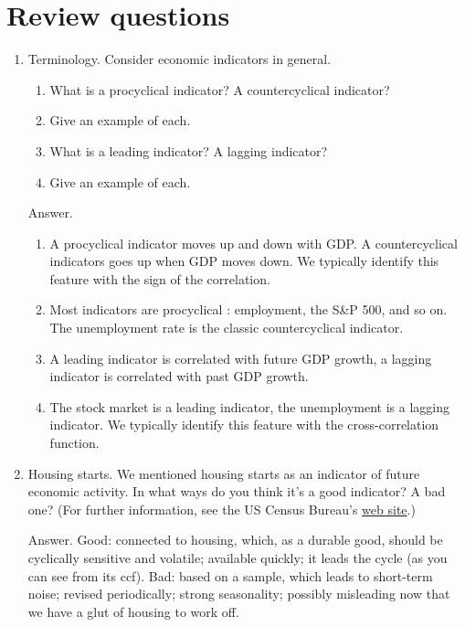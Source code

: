 \section*{Review questions}

\begin{enumerate}
\item Terminology. Consider economic indicators in general.
\begin{enumerate}
\item What is a procyclical indicator? A   countercyclical
 indicator?
\item Give an example of each.
\item What is a leading indicator?  A lagging indicator?
\item Give an example of each.
\end{enumerate}

Answer.
\begin{enumerate}
\item A procyclical indicator moves up and down with GDP.
A   countercyclical
 indicators goes up when GDP moves down.
We typically identify this feature with the sign of the correlation.
\item Most indicators are procyclical
:  employment, the S\&P 500, and so on.
The unemployment rate is the classic   countercyclical
 indicator.
\item A leading indicator is correlated with future GDP growth,
a lagging indicator is correlated with past GDP growth.
\item The stock market is a leading indicator,
the unemployment is a lagging indicator.
We typically identify this feature with the cross-correlation function.
\end{enumerate}


\item Housing starts.
We mentioned housing starts as an indicator
of future economic activity.
In what ways do you think it's a good indicator?  A bad one?
(For further information, see the US Census Bureau's
\href{http://www.census.gov/construction/nrc/}
{web site}.)

Answer.  Good:  connected to housing, which, as a durable good,
should be cyclically sensitive and volatile; available quickly; it
leads the cycle (as you can see from its ccf). Bad: based on a sample,
which leads to short-term noise; revised periodically;
strong seasonality;
possibly misleading now that we have a glut of housing to work off.


\end{enumerate}
